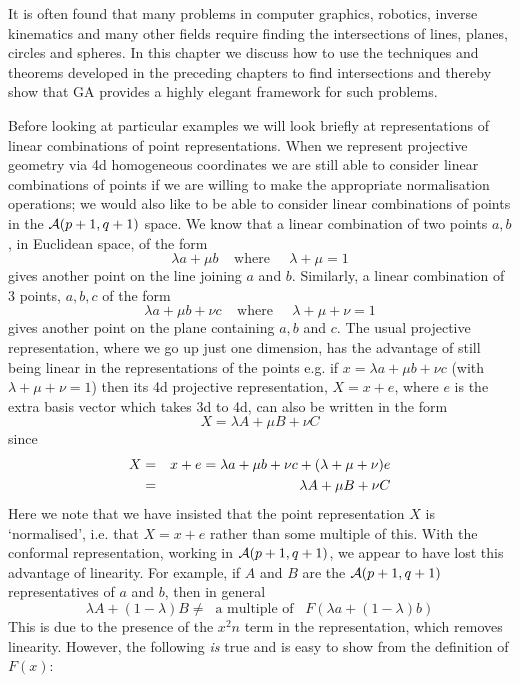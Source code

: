 It is often found that many problems in computer graphics,
robotics, inverse kinematics and many other fields require
finding the intersections of lines, planes, circles and spheres.
In this chapter we discuss how to use the techniques and theorems
developed in the preceding chapters to find intersections
and thereby show that GA provides a highly elegant framework
for such problems.

Before looking at particular examples we will look
briefly at representations of linear combinations of
point representations. When we represent projective geometry via 4d
homogeneous coordinates we are still able to consider
linear combinations of points if we are willing to make
the appropriate normalisation operations; we would also
like to be able to consider linear combinations of points
in the ${\mathcal{A}}(p+1,q+1)$ space. We know that a linear
combination of two points $a,b$, in Euclidean space, of
the form
%
\[  \lambda a + \mu b \;\;\;\; \mbox{where} \;\;\;\;\; \lambda + \mu =1  \]
%
gives another point on the line joining $a$ and $b$.
Similarly, a linear combination of 3 points, $a,b,c$ of
the form
%
\[  \lambda a + \mu b  + \nu c  \;\;\;\; \mbox{where} \;\;\;\;\; \lambda + \mu  + \nu=1  \]
%
gives another point on the plane containing $a,b$ and
$c$. The usual projective representation, where we go up
just one dimension, has the advantage of still being
linear in the representations of the points e.g. if
$x=\lambda a + \mu b + \nu c$  (with $\lambda + \mu + \nu
=1$) then its 4d projective representation, $X=x+e$,
where $e$ is the extra basis vector which takes 3d to 4d,
can also be written in the form
%
\[ X = \lambda A + \mu B + \nu C  \]
%
since
%
\begin{eqnarray}
 X  & =  & x+e=\lambda a + \mu b + \nu c +
 (\lambda+\mu+\nu)e \nonumber \\
 &    = &  \lambda A + \mu B + \nu C  \nonumber
 \end{eqnarray}
Here we note that we have insisted that the point representation
$X$ is `normalised', i.e. that $X=x + e$ rather than some
multiple of this. With the conformal representation,
working in ${\mathcal{A}}(p+1,q+1)$, we appear to have lost
this advantage of linearity. For example, if $A$ and $B$
are the ${\mathcal{A}}(p+1,q+1)$ representatives of $a$ and
$b$, then in general
%
\[ \lambda A + (1-\lambda)B \ne \;\;\mbox{a multiple of}\;\;\; F(\lambda a + (1-\lambda)b)  \]
%
This is due to the presence of the $x^2n$ term in the
representation, which removes linearity. However, the
following \emph{is} true and is easy to show from the
definition of $F(x)$:
